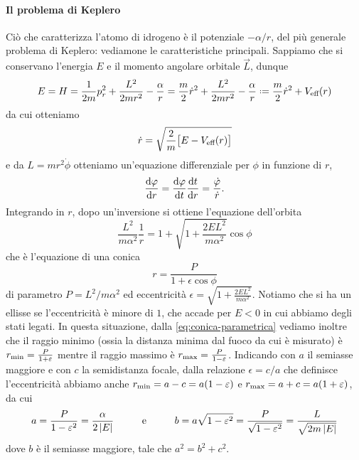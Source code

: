 \paragraph{Il problema di Keplero}
Ciò che caratterizza l'atomo di idrogeno è il potenziale $-\alpha/r$, del più generale problema di Keplero: vediamone le caratteristiche principali.
Sappiamo che si conservano l'energia $E$ e il momento angolare orbitale $\vec L$, dunque
\begin{equation}
	E=H=\frac1{2m}p_r^2+\frac{L^2}{2mr^2}-\frac{\alpha}{r}=\frac{m}{2}\dot{r}^2+\frac{L^2}{2mr^2}-\frac{\alpha}{r}\defeq\frac{m}{2}\dot{r}^2+V_\textup{eff}(r)
	\label{eq:energia-keplero}
\end{equation}
da cui otteniamo
\begin{equation}
	\dot{r}=\sqrt{\frac2{m}\big[E-V_\textup{eff}(r)\big]}
	\label{eq:velocita-radiale-keplero}
\end{equation}
e da $L=mr^2\dot{\phi}$ otteniamo un'equazione differenziale per $\phi$ in funzione di $r$,
\begin{equation}
	\drv{\phi}{r}=\drv{\phi}{t}\drv{t}{r}=\frac{\dot{\phi}}{\dot{r}}.
\end{equation}
Integrando in $r$, dopo un'inversione si ottiene l'equazione dell'orbita
\begin{equation}
	\frac{L^2}{m\alpha^2}\frac1{r}=1+\sqrt{1+\frac{2EL^2}{m\alpha^2}}\cos\phi
	\label{eq:orbita-keplero}
\end{equation}
che è l'equazione di una conica
\begin{equation}
	r=\frac{P}{1+\epsilon\cos\phi}
	\label{eq:conica-parametrica}
\end{equation}
di parametro $P=L^2/m\alpha^2$ ed eccentricità $\epsilon=\sqrt{1+\frac{2EL^2}{m\alpha^2}}$.
Notiamo che si ha un ellisse se l'eccentricità è minore di $1$, che accade per $E<0$ in cui abbiamo degli stati legati.
In questa situazione, dalla \eqref{eq:conica-parametrica} vediamo inoltre che il raggio minimo (ossia la distanza minima dal fuoco da cui è misurato) è $r_\textup{min}=\frac{P}{1+\epsilon}$ mentre il raggio massimo è $r_\textup{max}=\frac{P}{1-\epsilon}$.
Indicando con $a$ il semiasse maggiore e con $c$ la semidistanza focale, dalla relazione $\epsilon=c/a$ che definisce l'eccentricità abbiamo anche $r_\textup{min}=a-c=a(1-\epsilon)$ e $r_\textup{max}=a+c=a(1+\epsilon)$, da cui
\begin{equation}
	a=\frac{P}{1-\epsilon^2}=\frac{\alpha}{2\abs{E}}\hspace{1cm}\text{e}\hspace{1cm}b=a\sqrt{1-\epsilon^2}=\frac{P}{\sqrt{1-\epsilon^2}}=\frac{L}{\sqrt{2m\abs{E}}}
	\label{eq:semiassi-keplero}
\end{equation}
dove $b$ è il semiasse maggiore, tale che $a^2=b^2+c^2$.

